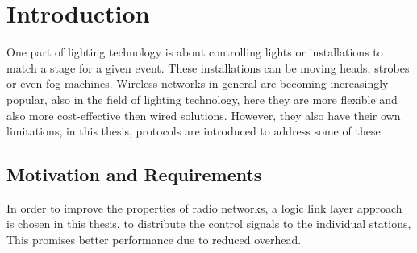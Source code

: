 \chapter{Introduction}


One part of lighting technology is about controlling lights or installations to match a stage for a given event.
These installations can be moving heads, strobes or even fog machines.
Wireless networks in general are becoming increasingly popular, also in the field of lighting technology,
here they are more flexible and also more cost-effective then wired solutions.
However, they also have their own limitations,
in this thesis, protocols are introduced to address some of these.

\section*{Motivation and Requirements}

In order to improve the properties of radio networks, a logic link layer approach is chosen in this thesis,
to distribute the control signals to the individual stations,
This promises better performance due to reduced overhead.

